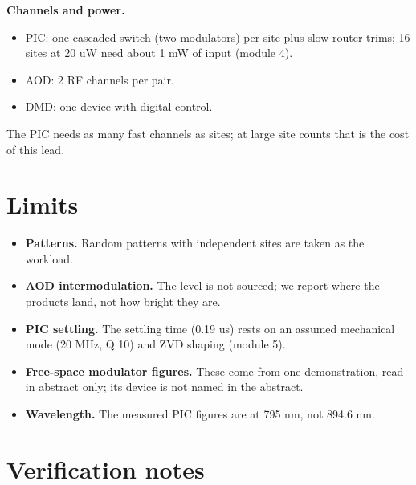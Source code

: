 \textbf{Channels and power.}

\begin{itemize}
\tightlist
\item
  PIC: one cascaded switch (two modulators) per site plus slow router
  trims; 16 sites at 20 uW need about 1 mW of input (module 4).
\item
  AOD: 2 RF channels per pair.
\item
  DMD: one device with digital control.
\end{itemize}

The PIC needs as many fast channels as sites; at large site counts that
is the cost of this lead.

\hypertarget{4-limits}{%
\section{Limits}\label{addressing-4-limits}}

\begin{itemize}
\tightlist
\item
  \textbf{Patterns.} Random patterns with independent sites are taken as
  the workload.
\item
  \textbf{AOD intermodulation.} The level is not sourced; we report
  where the products land, not how bright they are.
\item
  \textbf{PIC settling.} The settling time (0.19 us) rests on an assumed
  mechanical mode (20 MHz, Q 10) and ZVD shaping (module 5).
\item
  \textbf{Free-space modulator figures.} These come from one
  demonstration, read in abstract only; its device is not named in the
  abstract.
\item
  \textbf{Wavelength.} The measured PIC figures are at 795 nm, not 894.6
  nm.
\end{itemize}

\hypertarget{verification-notes}{%
\section{Verification notes}\label{addressing-verification-notes}}

